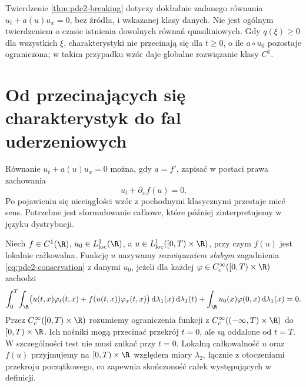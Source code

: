 \begin{uwaga}
Twierdzenie \ref{thm:pde2-breaking} dotyczy dokładnie
zadanego równania $u_t+a(u)u_x=0$, bez źródła,
i wskazanej klasy danych. Nie jest ogólnym twierdzeniem
o czasie istnienia dowolnych równań quasiliniowych.
Gdy $q(\xi)\geq0$ dla wszystkich $\xi$, charakterystyki
nie przecinają się dla $t\geq0$, o ile
$a\circ u_0$ pozostaje ograniczona; w takim przypadku
wzór daje globalne rozwiązanie klasy $C^1$.
\end{uwaga}

\section{Od przecinających się charakterystyk do fal uderzeniowych}
\label{sec:pde2-shocks}

Równanie $u_t+a(u)u_x=0$ można, gdy $a=f'$,
zapisać w postaci prawa zachowania
\begin{equation}\label{eq:pde2-conservation}
 u_t+\partial_x f(u)=0.
\end{equation}
Po pojawieniu się nieciągłości wzór z pochodnymi
klasycznymi przestaje mieć sens. Potrzebne jest
sformułowanie całkowe, które później zinterpretujemy
w języku dystrybucji.

\begin{definicja}
\label{def:pde2-weak}
Niech $f\in C^1(\R)$, $u_0\in L^1_{\mathrm{loc}}(\R)$,
a $u\in L^1_{\mathrm{loc}}([0,T)\times\R)$, przy czym
$f(u)$ jest lokalnie całkowalna. Funkcję $u$ nazywamy
\emph{rozwiązaniem słabym} zagadnienia
\eqref{eq:pde2-conservation} z danymi $u_0$, jeżeli
dla każdej $\varphi\in C_c^\infty([0,T)\times\R)$
zachodzi
\begin{equation}\label{eq:pde2-weak-form}
 \int_0^T\!\int_\R
 \bigl(u(t,x)\varphi_t(t,x)+f(u(t,x))\varphi_x(t,x)\bigr)
 \,\mathrm d\lambda_1(x)\,\mathrm d\lambda_1(t)
 +\int_\R u_0(x)\varphi(0,x)\,\mathrm d\lambda_1(x)=0.
\end{equation}
Przez $C_c^\infty([0,T)\times\R)$ rozumiemy
ograniczenia funkcji z $C_c^\infty((-\infty,T)\times\R)$
do $[0,T)\times\R$. Ich nośniki mogą przecinać przekrój
$t=0$, ale są oddalone od $t=T$.
W szczególności test nie musi znikać przy $t=0$.
Lokalną całkowalność $u$ oraz $f(u)$ przyjmujemy
na $[0,T)\times\R$ względem miary $\lambda_2$,
łącznie z otoczeniami przekroju początkowego,
co zapewnia skończoność całek występujących w definicji.
\end{definicja}

